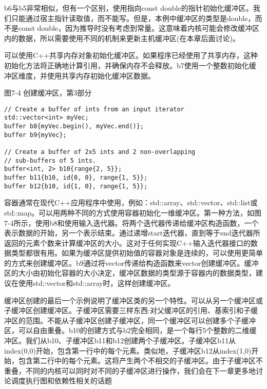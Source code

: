 b6与b5非常相似，但有一个区别，使用指向const double的指针初始化缓冲区。我们只能通过宿主指针读取值，而不能写。但是，本例中缓冲区的类型是double，而不是const double，因为推导时没有考虑到常量。这意味着内核可能会修改缓冲区内的数据，所以需要使用不同的机制来更新主机缓冲区(在本章后面讨论)。\par

可以使用C++共享内存对象初始化缓冲区。如果程序已经使用了共享内存，这种初始化方法将正确地计算引用，并确保内存不会释放。b7使用一个整数初始化缓冲区维度，并使用共享内存初始化缓冲区数据。\par

\hspace*{\fill} \par %
图7-4 创建缓冲区，第3部分
\begin{lstlisting}[caption={}]
// Create a buffer of ints from an input iterator
std::vector<int> myVec;
buffer b8{myVec.begin(), myVec.end()};
buffer b9{myVec};

// Create a buffer of 2x5 ints and 2 non-overlapping 
// sub-buffers of 5 ints.
buffer<int, 2> b10{range{2, 5}};
buffer b11{b10, id{0, 0}, range{1, 5}};
buffer b12{b10, id{1, 0}, range{1, 5}};
\end{lstlisting}

容器通常在现代C++应用程序中使用，例如：std::array、std::vector、std::list或std::map。可以用两种不同的方式使用容器初始化一维缓冲区。第一种方法，如图7-4所示，使用b8和使用输入迭代器。将两个迭代器传递给缓冲区构造函数，一个表示数据的开始，另一个表示结束。通过递增start迭代器，直到等于end迭代器所返回的元素个数来计算缓冲区的大小。这对于任何实现C++输入迭代器接口的数据类型都很有用。如果为缓冲区提供初始值的容器对象是连续的，可以使用更简单的方式来创建缓冲区。b9通过将vector传递给构造函数来vector创建缓冲区。缓冲区的大小由初始化容器的大小决定，缓冲区数据的类型源于容器内的数据类型，建议在使用std::vector和std::array时，这样创建缓冲区。\par

缓冲区创建的最后一个示例说明了缓冲区类的另一个特性。可以从另一个缓冲区或子缓冲区创建缓冲区。子缓冲区需要三样东西:对父缓冲区的引用、基索引和子缓冲区的范围。不能从子缓冲区创建子缓冲区，同一个缓冲区可以创建多个子缓冲区，可以自由重叠。b10的创建方式与b2完全相同，是一个每行5个整数的二维缓冲区。我们从b10、子缓冲区b11和b12创建两个子缓冲区。子缓冲区b11从index(0,0)开始，包含第一行中的每个元素。类似地，子缓冲区b12从index(1,0)开始，包含第二行中的每个元素。这将产生两个不相交的子缓冲区。由于子缓冲区不重叠，不同的内核可以同时对不同的子缓冲区进行操作，我们会在下一章更多地讨论调度执行图和依赖性相关的话题\par

